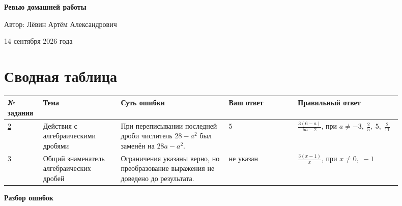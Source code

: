 \documentclass[12pt,a4paper]{article}
\begin{document}
\hypersetup{pageanchor=false}

\begin{titlepage}
\thispagestyle{empty}
\begin{center}
\vspace*{0.22\textheight}
{\Huge\bfseries Ревью домашней работы\par}
\vspace{2cm}
{\large Автор: Лёвин Артём Александрович\par}
\vspace{0.8cm}
{\large 14 сентября 2026 года\par}
\vfill
{}
\end{center}
\end{titlepage}
\hypersetup{pageanchor=true}

\newpage
\section*{Сводная таблица}
\small
\begin{tabular}{@{}>{\centering\arraybackslash}p{0.07\linewidth}
                  p{0.18\linewidth}
                  p{0.25\linewidth}
                  p{0.16\linewidth}
                  p{0.24\linewidth}@{}}
\toprule
\textbf{№ задания} & \textbf{Тема} & \textbf{Суть ошибки} & \textbf{Ваш ответ} & \textbf{Правильный ответ} \\
\midrule
\hyperref[task:2]{2} &
Действия с алгебраическими дробями &
При переписывании последней дроби числитель $28-a^2$ был заменён на $28a-a^2$. &
$5$ &
$\displaystyle \frac{3(6-a)}{5a-2}$, при $a\ne -3,\;\frac25,\;5,\;\frac{2}{11}$ \\
\addlinespace
\hyperref[task:3]{3} &
Общий знаменатель алгебраических дробей &
Ограничения указаны верно, но преобразование выражения не доведено до результата. &
не указан &
$\displaystyle \frac{3(x-1)}{x}$, при $x\ne0,\;-1$ \\
\bottomrule
\end{tabular}
\normalsize

\newpage
\thispagestyle{empty}
\vspace*{\fill}
\begin{center}
{\Huge\bfseries Разбор ошибок}
\end{center}
\vspace*{\fill}
\end{document}
